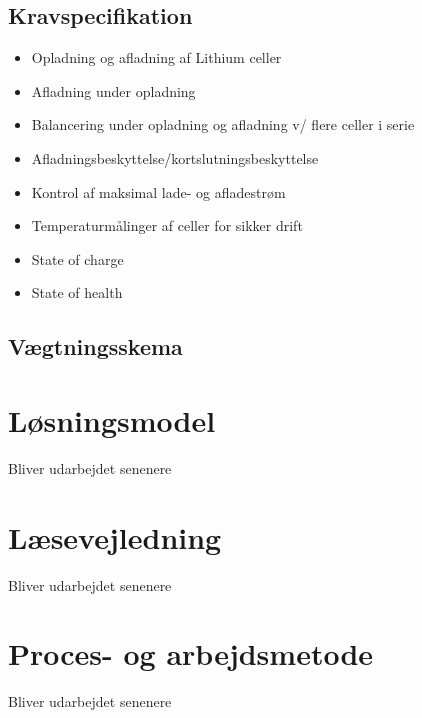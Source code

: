 \subsection{Kravspecifikation} \label{afs:kravspecifikation}

\begin{itemize}
	\item Opladning og afladning af Lithium celler
	\item Afladning under opladning
	\item Balancering under opladning og afladning v/ flere celler i serie
	\item Afladningsbeskyttelse/kortslutningsbeskyttelse
	\item Kontrol af maksimal lade- og afladestrøm
	\item Temperaturmålinger af celler for sikker drift
	\item State of charge
	\item State of health
\end{itemize}

\subsection{Vægtningsskema}

\section{Løsningsmodel}
Bliver udarbejdet senenere

\section{Læsevejledning}
Bliver udarbejdet senenere

\section{Proces- og arbejdsmetode}
Bliver udarbejdet senenere
